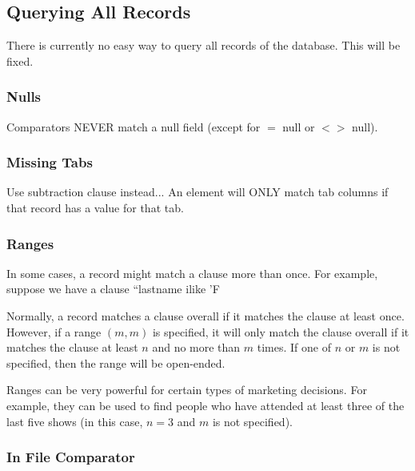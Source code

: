 \documentclass[11pt]{article}
\begin{document}
\subsection{Querying All Records}

There is currently no easy way to query all records of the database.  This will be fixed.

\subsubsection{Nulls}

Comparators NEVER match a null field (except for $=$ null or $<>$ null).

\subsubsection{Missing Tabs}

Use subtraction clause instead...
An element will ONLY match tab columns if that record has a value for that tab.

\subsubsection{Ranges}

In some cases, a record might match a clause more than once.  For example, suppose we have a clause ``lastname ilike 'F%

Normally, a record matches a clause overall if it matches the clause at least once.  However, if a range $(m,m)$ is specified, it will only match the clause overall if it matches the clause at least $n$ and no more than $m$ times.  If one of $n$ or $m$ is not specified, then the range will be open-ended.

Ranges can be very powerful for certain types of marketing decisions.  For example, they can be used to find people who have attended at least three of the last five shows (in this case, $n=3$ and $m$ is not specified).

\subsubsection{In File Comparator}
\end{document}
